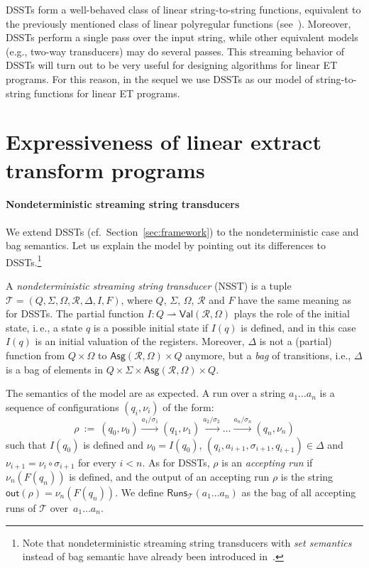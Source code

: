 \documentclass[
a4paper
]{article}
\theoremstyle{plain}
\theoremstyle{definition}
\theoremstyle{remark}
\newcommand{\pmap}{\rightharpoonup}
\newcommand{\Reg}{\mathcal{R}}
\newcommand{\Asg}{\operatorname{Asg}}
\newcommand{\Val}{\operatorname{Val}}
\newcommand{\nsst}{\mathcal{T}}
\newcommand{\out}{\operatorname{out}}
\newcommand{\Runs}{\operatorname{Runs}}
\renewcommand{\operatorname}[1]{\textsf{#1}}
\begin{document}
DSSTs form a well-behaved class of linear string-to-string functions, equivalent to the previously mentioned class of linear polyregular functions (see~\cite{Bojanczyk22,AlurC10}). Moreover, DSSTs perform a single pass over the input string,
while 
other equivalent models (e.g., two-way transducers)
may
do several passes. This streaming behavior
of DSSTs
will
turn out to
be very useful for designing algorithms for linear ET programs. For this reason, in the sequel we use DSSTs as our model of string-to-string functions for linear ET programs.

 	
\section{Expressiveness of linear extract transform programs}\label{sec:properties}
	
\paragraph{Nondeterministic streaming string transducers} We
extend DSSTs
(cf.\ 
Section~\ref{sec:framework}) to the nondeterministic case and bag semantics. Let us explain the model by pointing out its differences to DSSTs.\footnote{Note that nondeterministic streaming string transducers with \emph{set semantics} instead of bag semantic have already been introduced in~\cite{AlurD11}.}

A \emph{nondeterministic streaming string transducer} (NSST) is a tuple $\nsst = (Q, \Sigma, \Omega,  \Reg, \Delta, I, F)$,
where $Q$, $\Sigma$, $\Omega$, $\Reg$ and $F$ have the same meaning as for DSSTs. The partial function $I: Q \pmap \Val(\Reg, \Omega)$ plays the role of the initial state, i.\,e., a state $q$ is a possible initial state if $I(q)$ is defined, and in this case $I(q)$ is an initial valuation of the registers. 
Moreover, $\Delta$ is not a
(partial)
function from $Q \times \Omega$ to $\Asg(\Reg, \Omega) \times Q$ anymore, but a \emph{bag} of transitions,
i.e., $\Delta$ is a bag of elements in $Q \times \Sigma \times \Asg(\Reg, \Omega) \times Q$.

The semantics of the model are as expected. A run over a string $a_1 \ldots a_n$ is a sequence of configurations $(q_i, \nu_i)$ of the form:
\begin{equation*}
	\rho \ := \ (q_0, \nu_0) \xrightarrow{a_1/\sigma_1} (q_1, \nu_1) \xrightarrow{a_2 /\sigma_2} \ldots \xrightarrow{a_n/\sigma_{n}} (q_{n}, \nu_n)
\end{equation*}
such that $I(q_0)$ is defined and $\nu_0 = I(q_0)$, $(q_i, a_{i+1}, \sigma_{i+1}, q_{i+1}) \in \Delta$ and $\nu_{i+1} = \nu_i \circ \sigma_{i+1}$ for every $i < n$. As for DSSTs, $\rho$ is an \emph{accepting run} if $\nu_n(F(q_n))$ is defined, and the output of an accepting run $\rho$ is the string $\out(\rho) = \nu_n(F(q_n))$. We define $\Runs_{\nsst}(a_1 \ldots a_n)$ as the bag of all accepting runs of $\nsst$ over~$a_1 \ldots a_n$.
\end{document}
